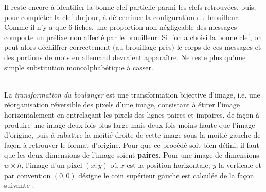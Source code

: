 \documentclass[11pt, a4paper]{article}
\begin{document}
\vspace{0.3cm}

\noindent Il reste encore à identifier la bonne clef partielle parmi les clefs
retrouvées, puis, pour compléter la clef du jour, à déterminer la
configuration du brouilleur. Comme il n'y a que 6 fiches, une
proportion non négligeable des messages comporte un préfixe non
affecté par le brouilleur. Si l'on a choisi la bonne clef, on peut
alors déchiffrer correctement (au brouillage près) le corps de ces
messages et des portions de mots en allemand devraient apparaître. Ne
reste plus qu'une simple substitution monoalphabétique à casser.



\\
La \emph{transformation du boulanger} est une transformation bijective
d'image, i.e. une réorganisation réversible des pixels d'une image,
consistant à étirer l'image horizontalement en entrelaçant les pixels
des lignes paires et impaires, de façon à produire une image deux fois
plus large mais deux fois moins haute que l'image d'origine, puis à
rabattre la moitié droite de cette image sous la moitié gauche de
façon à retrouver le format d'origine. Pour que ce procédé soit bien
défini, il faut que les deux dimensions de l'image soient \textbf{paires}. Pour une image de dimensions $w\times h$, l'image d'un pixel $(x,y)$ \incise{} où $x$ est la position horizontale, $y$ la verticale et par convention $(0,0)$ désigne le coin supérieur gauche \incise{} est calculée de la façon suivante :
\vspace{-0.2cm}


\vspace{0.2cm}

\end{document}
